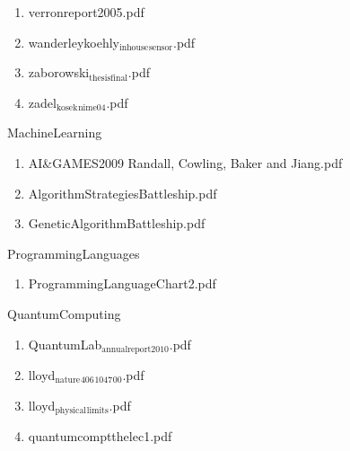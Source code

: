 \documentclass[11pt]{article}
\begin{document}
\begin{enumerate}
\begin{enumerate}
\item verronreport2005.pdf
\label{sec-1-1-1-1-15-7-3-29}

\item wanderleykoehly$_{\text{inhouse}}$$_{\text{sensor}}$.pdf
\label{sec-1-1-1-1-15-7-3-30}

\item zaborowski$_{\text{thesisfinal}}$.pdf
\label{sec-1-1-1-1-15-7-3-31}

\item zadel$_{\text{kosek}}$$_{\text{nime04}}$.pdf
\label{sec-1-1-1-1-15-7-3-32}
\end{enumerate}
\end{enumerate}

\item MachineLearning
\label{sec-1-1-1-1-15-8}
\begin{enumerate}
\item AI\&GAMES2009 Randall, Cowling,  Baker and Jiang.pdf
\label{sec-1-1-1-1-15-8-1}

\item AlgorithmStrategiesBattleship.pdf
\label{sec-1-1-1-1-15-8-2}

\item GeneticAlgorithmBattleship.pdf
\label{sec-1-1-1-1-15-8-3}
\end{enumerate}

\item ProgrammingLanguages
\label{sec-1-1-1-1-15-9}
\begin{enumerate}
\item ProgrammingLanguageChart2.pdf
\label{sec-1-1-1-1-15-9-1}
\end{enumerate}

\item QuantumComputing
\label{sec-1-1-1-1-15-10}
\begin{enumerate}
\item QuantumLab$_{\text{annualreport2010}}$.pdf
\label{sec-1-1-1-1-15-10-1}

\item lloyd$_{\text{nature}}$$_{\text{406}}$$_{\text{1047}}$$_{\text{00}}$.pdf
\label{sec-1-1-1-1-15-10-2}

\item lloyd$_{\text{physical}}$$_{\text{limits}}$.pdf
\label{sec-1-1-1-1-15-10-3}

\item quantumcomptthelec1.pdf
\label{sec-1-1-1-1-15-10-4}
\end{enumerate}
\end{document}
